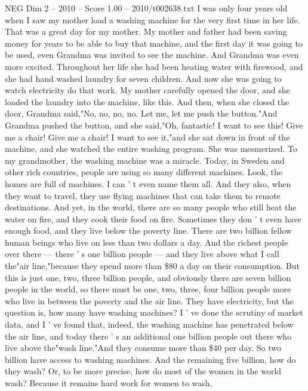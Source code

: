 \begin{textsample}{NEG Dim 2 – 2010 – Score 1.00 – 2010/t002638.txt}  \label{ex:f2_neg_022}
I was only four years old when I saw my mother load a washing machine for the very first time in her life.
That was a great day for my mother.
My mother and father had been saving money for years to be able to buy that machine, and the first day it was going to be used, even Grandma was invited to see the machine.
And Grandma was even more excited.
Throughout her life she had been heating water with firewood, and she had hand washed laundry for seven children.
And now she was going to watch electricity do that work.
My mother carefully opened the door, and she loaded the laundry into the machine, like this.
And then, when she closed the door, Grandma said,"No, no, no, no.
Let me, let me push the button."And Grandma pushed the button, and she said,"Oh, fantastic!
I want to see this!
Give me a chair!
Give me a chair!
I want to see it,"and she sat down in front of the machine, and she watched the entire washing program.
She was mesmerized.
To my grandmother, the washing machine was a miracle.
Today, in Sweden and other rich countries, people are using so many different machines.
Look, the homes are full of machines.
I can ' t even name them all.
And they also, when they want to travel, they use flying machines that can take them to remote destinations.
And yet, in the world, there are so many people who still heat the water on fire, and they cook their food on fire.
Sometimes they don ' t even have enough food, and they live below the poverty line.
There are two billion fellow human beings who live on less than two dollars a day.
And the richest people over there — there ' s one billion people — and they live above what I call the"air line,"because they spend more than \$80 a day on their consumption.
But this is just one, two, three billion people, and obviously there are seven billion people in the world, so there must be one, two, three, four billion people more who live in between the poverty and the air line.
They have electricity, but the question is, how many have washing machines?
I ' ve done the scrutiny of market data, and I ' ve found that, indeed, the washing machine has penetrated below the air line, and today there ' s an additional one billion people out there who live above the"wash line."And they consume more than \$40 per day.
So two billion have access to washing machines.
And the remaining five billion, how do they wash?
Or, to be more precise, how do most of the women in the world wash?
Because it remains hard work for women to wash.

\end{textsample}
